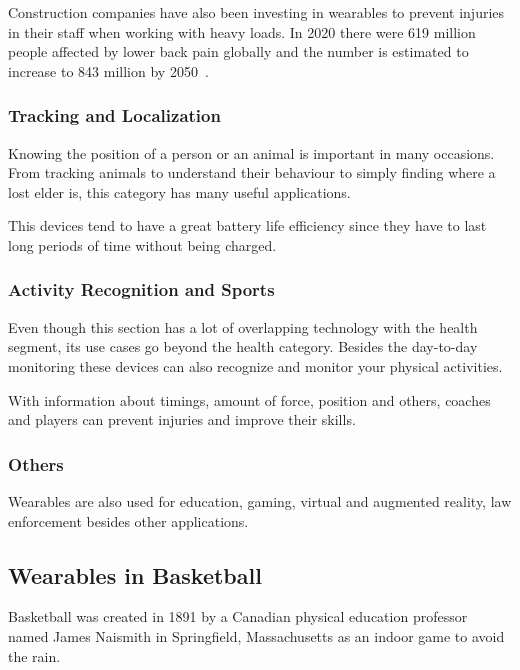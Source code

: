 Construction companies have also been investing in wearables to prevent injuries in their staff when working with heavy loads. In 2020 there were 619 million people affected by lower 
back pain globally and the number is estimated to increase to 843 million by 2050~\cite{lowerBack}.


\subsubsection{Tracking and Localization}
\label{ssub:trackingAndLocalization}

Knowing the position of a person or an animal is important in many occasions. From tracking animals to understand their behaviour to simply finding where a lost elder is, this category has many useful applications.

This devices tend to have a great battery life efficiency since they have to last long periods of time without being charged. 

\subsubsection{Activity Recognition and Sports}
\label{ssub:activityRecognitionAndSports}

Even though this section has a lot of overlapping technology with the health segment, its use cases go beyond the health category. Besides the day-to-day monitoring these devices can also recognize and monitor your physical activities.

With information about timings, amount of force, position and others, coaches and players can prevent injuries and improve their skills.

\subsubsection{Others}
\label{ssub:others}

Wearables are also used for education, gaming, virtual and augmented reality, law enforcement besides other applications.

\newpage

\subsection{Wearables in Basketball}
\label{sub:wearablesInBasketball}

Basketball was created in 1891 by a Canadian physical education professor named James Naismith in Springfield, Massachusetts as an indoor game to avoid the rain. 

